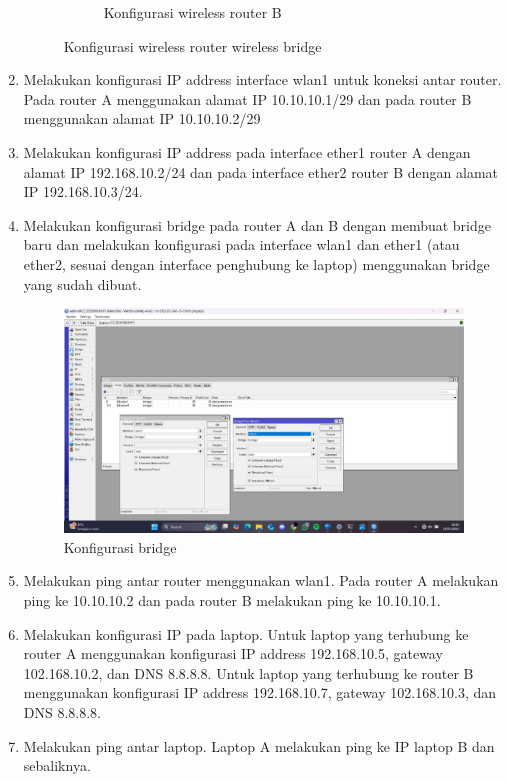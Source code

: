 \begin{enumerate}
\begin{figure}[H]
\begin{subfigure}[b]{0.4\linewidth}
			\caption{Konfigurasi wireless router B\label{fig:konfigurasiR2}}
		\end{subfigure}
		\caption{Konfigurasi wireless router wireless  bridge}
		\hspace{1cm}
	\end{figure}
	\item Melakukan konfigurasi IP address interface wlan1 untuk koneksi antar router. Pada router A menggunakan alamat IP 10.10.10.1/29 dan pada router B menggunakan alamat IP 10.10.10.2/29
	\item Melakukan konfigurasi IP address pada interface ether1 router A dengan alamat IP 192.168.10.2/24 dan pada interface ether2 router B dengan alamat IP 192.168.10.3/24.
	\item Melakukan konfigurasi bridge pada router A dan B dengan membuat bridge baru dan melakukan konfigurasi pada interface wlan1 dan ether1 (atau ether2, sesuai dengan interface penghubung ke laptop) menggunakan bridge yang sudah dibuat.
	\begin{figure}[H]
		\centering
		\includegraphics[scale=0.5]{P3/img/wb bridge.jpg}
		\caption{Konfigurasi bridge}
	\end{figure}
	\item Melakukan ping antar router menggunakan wlan1. Pada router A melakukan ping ke 10.10.10.2 dan pada router B melakukan ping ke 10.10.10.1.
	\item Melakukan konfigurasi IP pada laptop. Untuk laptop yang terhubung ke router A menggunakan konfigurasi IP address 192.168.10.5, gateway 102.168.10.2, dan DNS 8.8.8.8. Untuk laptop yang terhubung ke router B menggunakan konfigurasi IP address 192.168.10.7, gateway 102.168.10.3, dan DNS 8.8.8.8.
	\item Melakukan ping antar laptop. Laptop A melakukan ping ke IP laptop B dan sebaliknya.
\end{enumerate}

